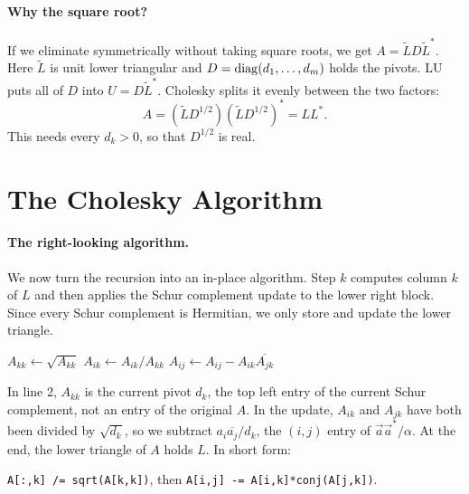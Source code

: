 \paragraph{Why the square root?} If we eliminate symmetrically without taking square roots, we get $A = \tilde{L}D\tilde{L}^\ast$. Here $\tilde{L}$ is unit lower triangular and $D = \operatorname{diag}(d_1, \dots, d_m)$ holds the pivots. LU puts all of $D$ into $U = D\tilde{L}^\ast$. Cholesky splits it evenly between the two factors:
\begin{equation}
  A = (\tilde{L}D^{1/2})(\tilde{L}D^{1/2})^\ast = LL^\ast.
\end{equation}
This needs every $d_k > 0$, so that $D^{1/2}$ is real.

\section{The Cholesky Algorithm}

\paragraph{The right-looking algorithm.} We now turn the recursion into an in-place algorithm. Step $k$ computes column $k$ of $L$ and then applies the Schur complement update to the lower right block. Since every Schur complement is Hermitian, we only store and update the lower triangle.

\begin{algorithm}[H]
  \caption{Cholesky factorization, right-looking, in place (lower triangle).}
  \label{alg:chol-right}
  \begin{algorithmic}[1]
      \State $A_{kk} \gets \sqrt{A_{kk}}$
        \State $A_{ik} \gets A_{ik} / A_{kk}$ 
      \EndFor
          \State $A_{ij} \gets A_{ij} - A_{ik}\overline{A_{jk}}$ 
        \EndFor
      \EndFor
    \EndFor
  \end{algorithmic}
\end{algorithm}

In line 2, $A_{kk}$ is the current pivot $d_k$, the top left entry of the current Schur complement, not an entry of the original $A$. In the update, $A_{ik}$ and $A_{jk}$ have both been divided by $\sqrt{d_k}$, so we subtract $a_i\overline{a_j}/d_k$, the $(i, j)$ entry of $\vec{a}\vec{a}^\ast/\alpha$. At the end, the lower triangle of $A$ holds $L$. In short form:
\begin{center}
  \texttt{A[:,k] /= sqrt(A[k,k])}, \quad then \quad \texttt{A[i,j] -= A[i,k]*conj(A[j,k])}.
\end{center}


